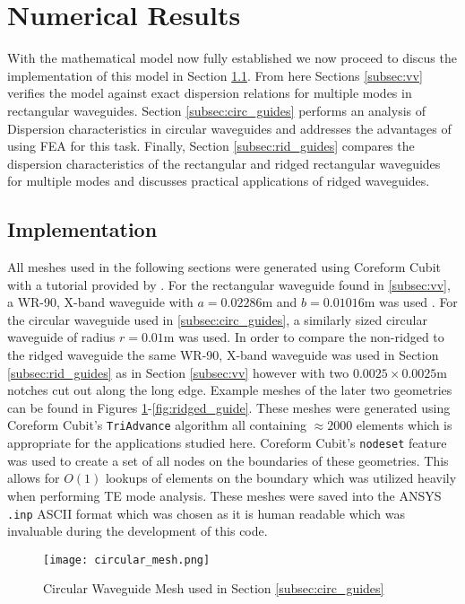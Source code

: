 \section{Numerical Results}
\label{sec:numres}
With the mathematical model now fully established we now proceed to discus the implementation of this model in Section \ref{subsec:impl}. From here Sections \ref{subsec:vv} verifies the model against exact dispersion relations for multiple modes in rectangular waveguides. Section \ref{subsec:circ_guides} performs an analysis of Dispersion characteristics in circular waveguides and addresses the advantages of using FEA for this task. Finally, Section \ref{subsec:rid_guides} compares the dispersion characteristics of the rectangular and ridged rectangular waveguides for multiple modes and discusses practical applications of ridged waveguides.

\subsection{Implementation}
\label{subsec:impl}
All meshes used in the following sections were generated using Coreform Cubit \cite{cubit} with a tutorial provided by \cite{rothlecnotes}. For the rectangular waveguide found in \ref{subsec:vv}, a WR-90, X-band waveguide with $a=0.02286$m and $b=0.01016$m was used \cite{everythingrf}. For the circular waveguide used in \ref{subsec:circ_guides}, a similarly sized circular waveguide of radius $r=0.01$m was used. In order to compare the non-ridged to the ridged waveguide the same WR-90, X-band waveguide was used in Section \ref{subsec:rid_guides} as in Section \ref{subsec:vv} however with two $0.0025\times0.0025$m notches cut out along the long edge. Example meshes of the later two geometries can be found in Figures \ref{fig:circular_guide}-\ref{fig:ridged_guide}. These meshes were generated using Coreform Cubit's \verb|TriAdvance| algorithm all containing $\approx2000$ elements which is appropriate for the applications studied here. Coreform Cubit's \verb|nodeset| feature was used to create a set of all nodes on the boundaries of these geometries. This allows for $O(1)$ lookups of elements on the boundary which was utilized heavily when performing TE mode analysis. These meshes were saved into the ANSYS \verb|.inp| ASCII format which was chosen as it is human readable which was invaluable during the development of this code.

\begin{figure}[h!]  
	\centering
	\texttt{[image: circular\_mesh.png]} 
	\caption{Circular Waveguide Mesh used in Section \ref{subsec:circ_guides}}
	\label{fig:circular_guide}
\end{figure}

